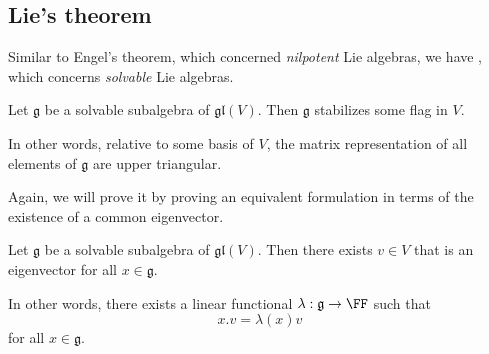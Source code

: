 \documentclass{article}
\newcommand*\frkg{{\ensuremath{\mathfrak{g}}}}
\newcommand*\gl{\ensuremath{\mathfrak{gl}}}
\newcommand*\acts{.}
\begin{document}
\subsection{Lie's theorem}

Similar to Engel's theorem, which concerned \textit{nilpotent} Lie algebras, we have , which concerns \textit{solvable} Lie algebras.

\begin{theorem}
    Let $\frkg$ be a solvable subalgebra of $\gl(V)$.
    Then $\frkg$ stabilizes some flag in $V$.
\end{theorem}

In other words, relative to some basis of $V$, the matrix representation of all elements of $\frkg$ are upper triangular.

Again, we will prove it by proving an equivalent formulation in terms of the existence of a common eigenvector.

\begin{theorem}
    \label{thm:SolvableAlgebraHasCommonEigenvector}
    Let $\frkg$ be a solvable subalgebra of $\gl(V)$.
    Then there exists $v \in V$ that is an eigenvector for all $x \in \frkg$.

    In other words, there exists a linear functional $\lambda: \frkg \to \FF$ such that 
    \[
        x \acts v
        =
        \lambda(x)v
    \]
    for all $x \in \frkg$.
\end{theorem}
\end{document}
